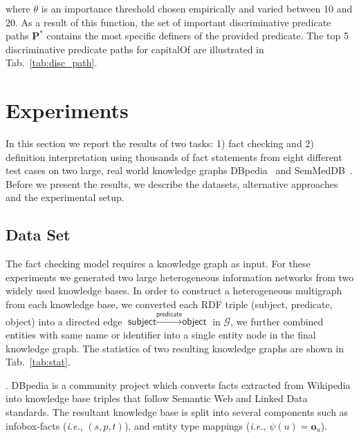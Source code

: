 \documentclass[reprint,twocolumn,showpacs,preprintnumbers,amsmath, aps,pre,amssymb]{revtex4-1}
\newcommand\ie{\emph{i.e.}}
\begin{document}
\noindent where $\theta$ is an importance threshold chosen empirically and varied between 10 and 20. As a result of this function, the set of important discriminative predicate paths $\mathbf{P}^*$ contains the most specific definers of the provided predicate. The top 5 discriminative predicate paths for \textsf{capitalOf} are illustrated in Tab.~\ref{tab:disc_path}.




\section{Experiments} \label{sec:experiment}



In this section we report the results of two tasks: 1) fact checking and 2) definition interpretation using thousands of fact statements from eight different test cases on two large, real world knowledge graphs DBpedia~\cite{Lehmann2014} and SemMedDB~\cite{Kilicoglu2012}. Before we present the results, we describe the datasets, alternative approaches and the experimental setup.

\subsection{Data Set}

The fact checking model requires a knowledge graph as input. For these experiments we generated two large heterogeneous information networks from two widely used knowledge bases. In order to construct a heterogeneous multigraph from each knowledge base, we converted each RDF triple (\textsf{subject}, \textsf{predicate}, \textsf{object}) into a directed edge $\textsf{subject} \xrightarrow{\textsf{predicate}} \textsf{object}$ in $\mathcal{G}$, we further combined entities with same name or identifier into a single entity node in the final knowledge graph. The statistics of two resulting knowledge graphs are shown in Tab.~\ref{tab:stat}.

\vspace{5pt}. DBpedia is a community project which converts facts extracted from Wikipedia into knowledge base triples that follow Semantic Web and Linked Data standards. The resultant knowledge base is split into several components such as infobox-facts (\ie, $(s,p,t)$), and entity type mappings (\ie, $\psi(u) = \mathbf{o}_u$).
\end{document}
